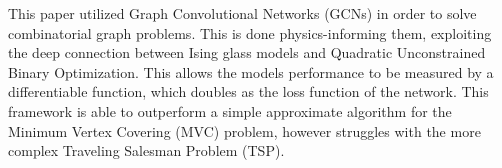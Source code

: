 This paper utilized Graph Convolutional Networks (GCNs) in order to solve combinatorial graph problems.
This is done physics-informing them, exploiting the deep connection between Ising glass models and Quadratic Unconstrained Binary Optimization.
This allows the models performance to be measured by a differentiable function, which doubles as the loss function of the network.
This framework is able to outperform a simple approximate algorithm for the Minimum Vertex Covering (MVC) problem, however struggles with the more complex Traveling Salesman Problem (TSP).


